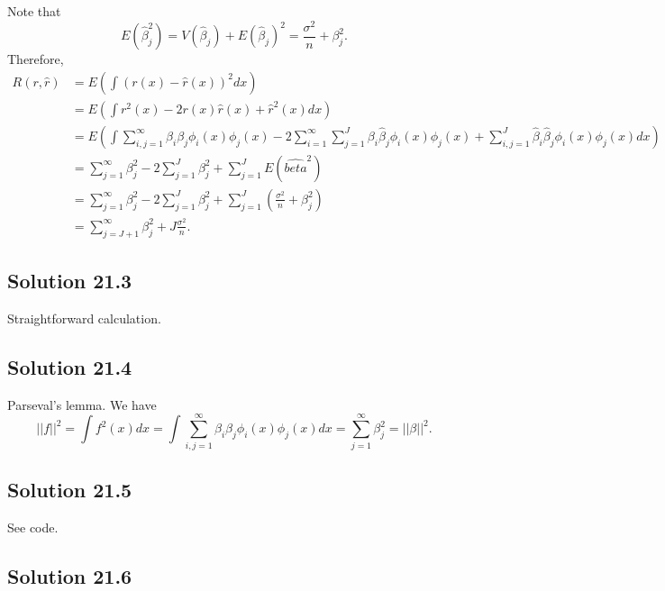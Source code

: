 Note that
\begin{equation*}
    E(\hat{\beta}_j^2) = V(\hat{\beta}_j) + E(\hat{\beta}_j)^2 = \frac{\sigma^2}{n} + \beta_j^2.
\end{equation*}
Therefore,
\begin{equation*}
    \begin{split}
        R(r, \hat{r}) &= E\left(\int (r(x) - \hat{r}(x))^2 dx\right) \\
            &= E\left(\int r^2(x) - 2r(x)\hat{r}(x) + \hat{r}^2(x) dx\right) \\
            &= E\left(\int \sum_{i, j = 1}^{\infty} \beta_i \beta_j \phi_i(x) \phi_j(x) - 2 \sum_{i = 1}^{\infty} \sum_{j = 1}^J \beta_i \hat{\beta}_j \phi_i(x) \phi_j(x) + \sum_{i, j = 1}^J \hat{\beta}_i \hat{\beta}_j \phi_i(x) \phi_j(x) dx\right) \\
            &= \sum_{j = 1}^{\infty} \beta_j^2 - 2\sum_{j = 1}^J \beta_j^2 + \sum_{j = 1}^J E(\hat{beta}^2) \\
            &= \sum_{j = 1}^{\infty} \beta_j^2 - 2\sum_{j = 1}^J \beta_j^2 + \sum_{j = 1}^J (\frac{\sigma^2}{n} + \beta_j^2) \\
            &= \sum_{j = J + 1}^{\infty} \beta_j^2 + J \frac{\sigma^2}{n}.
    \end{split}
\end{equation*}


\subsection*{Solution 21.3}

Straightforward calculation.


\subsection*{Solution 21.4}

Parseval's lemma.
We have
\begin{equation*}
    ||f||^2 = \int f^2(x) dx
        = \int \sum_{i, j = 1}^{\infty} \beta_i \beta_j \phi_i(x) \phi_j(x) dx
        = \sum_{j = 1}^{\infty} \beta_j^2
        = ||\beta||^2.
\end{equation*}


\subsection*{Solution 21.5}

See code.


\subsection*{Solution 21.6}


